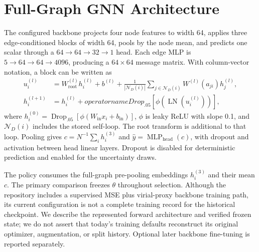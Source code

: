 \section{Full-Graph GNN Architecture}
\label{sec:gnn}
The configured backbone projects four node features to width 64, applies three edge-conditioned  blocks of width 64, pools by the node mean, and predicts one scalar through a $64\to64\to32\to1$ head. Each edge MLP is $5\to64\to64\to4096$, producing a $64\times64$ message matrix. With column-vector notation, a block can be written as
\begin{align}
 u_i^{(l)}&=W_{\mathrm{root}}^{(l)}h_i^{(l)}+b^{(l)}
 +\frac{1}{|\mathcal N_D(i)|}\sum_{j\in\mathcal N_D(i)}
 W^{(l)}(a_{ji})h_j^{(l)},\\
 h_i^{(l+1)}&=h_i^{(l)}+operatorname{Drop}_{.05}
 \left[\phi\!\left(\operatorname{LN}(u_i^{(l)})\right)\right],
\end{align}
where $h_i^{(0)}=\operatorname{Drop}_{.05}[\phi(W_{\mathrm{in}}x_i+b_{\mathrm{in}})]$, $\phi$ is leaky ReLU with slope 0.1, and $\mathcal N_D(i)$ includes the stored self-loop. The root transform is additional to that loop. Pooling gives $c=N^{-1}\sum_i h_i^{(3)}$ and $\hat y=\operatorname{MLP}_{\mathrm{head}}(c)$, with dropout and activation between head linear layers. Dropout is disabled for deterministic prediction and enabled for the uncertainty draws.

The policy consumes the full-graph pre-pooling embeddings $h_i^{(3)}$ and their mean $c$. The primary comparison freezes $\theta$ throughout selection. Although the repository includes a supervised MSE plus virial-proxy backbone training path, its current configuration is not a complete training record for the historical checkpoint. We describe the represented forward architecture and verified frozen state; we do not assert that today's training defaults reconstruct its original optimizer, augmentation, or split history. Optional later backbone fine-tuning is reported separately.
